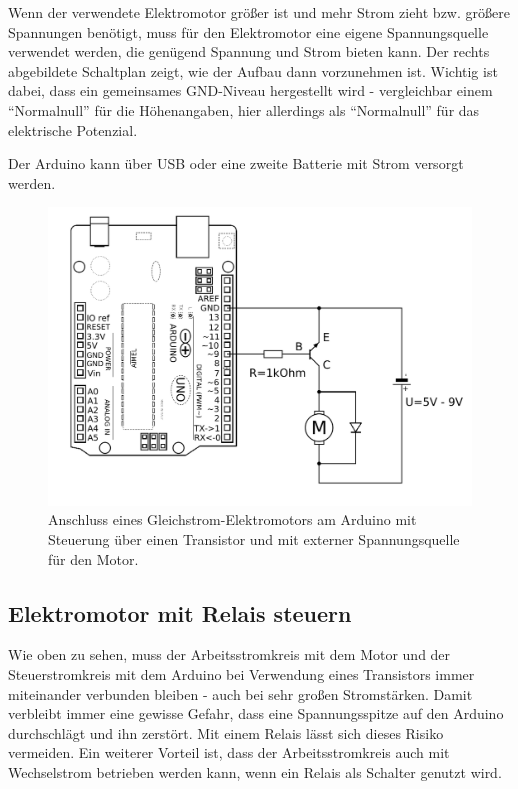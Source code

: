 \begin{minipage}{0.5\textwidth}
	Wenn der verwendete Elektromotor größer ist und mehr Strom zieht bzw. größere Spannungen benötigt, muss für den Elektromotor eine eigene Spannungsquelle verwendet werden, die genügend Spannung und Strom bieten kann. Der rechts abgebildete Schaltplan zeigt, wie der Aufbau dann vorzunehmen ist. Wichtig ist dabei, dass ein gemeinsames GND-Niveau hergestellt wird - vergleichbar einem \enquote{Normalnull} für die Höhenangaben, hier allerdings als \enquote{Normalnull} für das elektrische Potenzial.
	
	Der Arduino kann über USB oder eine zweite Batterie mit Strom versorgt werden.
\end{minipage}
\hfill
\begin{minipage}{0.48\textwidth}
	\begin{figure}[H]
		\centering
		\includegraphics[width=\textwidth]{./Zeichnungen/Schaltplan-Motoranschluss-ext-Spannung.png}
		\caption{Anschluss eines Gleichstrom-Elektromotors am Arduino mit Steuerung über einen Transistor und mit externer Spannungsquelle für den Motor.}
	\end{figure}
\end{minipage}

\vspace{2\baselineskip}
\subsection{Elektromotor mit Relais steuern}

Wie oben zu sehen, muss der Arbeitsstromkreis mit dem Motor und der Steuerstromkreis mit dem Arduino bei Verwendung eines Transistors immer miteinander verbunden bleiben - auch bei sehr großen Stromstärken. Damit verbleibt immer eine gewisse Gefahr, dass eine Spannungsspitze auf den Arduino durchschlägt und ihn zerstört. Mit einem Relais lässt sich dieses Risiko vermeiden. Ein weiterer Vorteil ist, dass der Arbeitsstromkreis auch mit Wechselstrom betrieben werden kann, wenn ein Relais als Schalter genutzt wird.

